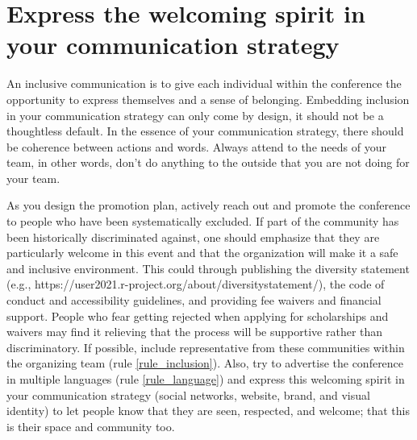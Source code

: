 \documentclass[10pt,letterpaper]{article}
\begin{document}


\section{Express the welcoming spirit in your communication strategy}
\label{rule_communication}
An inclusive communication is to give each individual within the conference the opportunity to express themselves and a sense of belonging. Embedding inclusion in your communication strategy can only come by design, it should not be a thoughtless default. In the essence of your communication strategy, there should be coherence between actions and words. Always attend to the needs of your team, in other words, don't do anything to the outside that you are not doing for your team. 

As you design the promotion plan, actively reach out and promote the conference to people who have been systematically excluded. If part of the community has been historically discriminated against, one should emphasize that they are particularly welcome in this event and that the organization will make it a safe and inclusive environment. This could through publishing the diversity statement (e.g., https://user2021.r-project.org/about/diversitystatement/), the code of conduct and accessibility guidelines, and providing fee waivers and financial support. People who fear getting rejected when applying for scholarships and waivers may find it relieving that the process will be supportive rather than discriminatory. If possible, include representative from these communities within the organizing team (rule \ref{rule_inclusion}). Also, try to advertise the conference in multiple languages (rule \ref{rule_language}) and express this welcoming spirit in your communication strategy (social networks, website, brand, and visual identity) to let people know that they are seen, respected, and welcome; that this is their space and community too.
\end{document}
